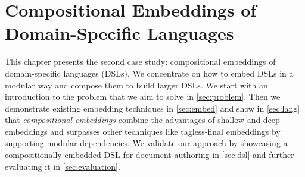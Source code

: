 \chapter{Compositional Embeddings of Domain-Specific Languages} \label{ch:embedding}

This chapter presents the second case study: compositional embeddings of
domain-specific languages (DSLs). We concentrate on how to embed DSLs in a
modular way and compose them to build larger DSLs. We start with an introduction
to the problem that we aim to solve in \autoref{sec:problem}. Then we
demonstrate existing embedding techniques in \autoref{sec:embed} and show in
\autoref{sec:lang} that \emph{compositional embeddings} combine the advantages
of shallow and deep embeddings and surpasses other techniques like tagless-final
embeddings by supporting modular dependencies. We validate our approach by
showcasing a compositionally embedded DSL for document authoring in
\autoref{sec:dsl} and further evaluating it in \autoref{sec:evaluation}.






